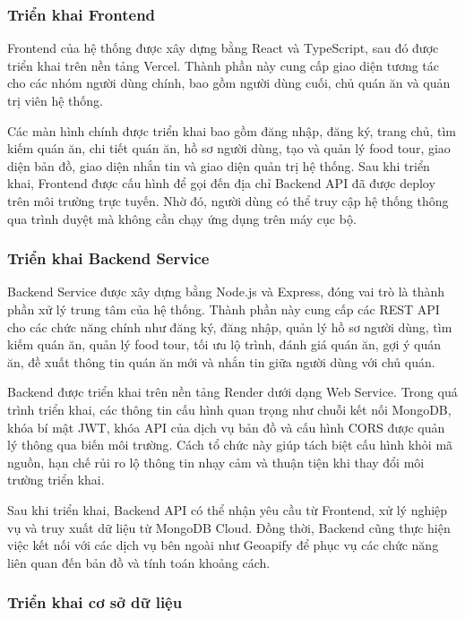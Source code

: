 \subsubsection{Triển khai Frontend}

Frontend của hệ thống được xây dựng bằng React và TypeScript, sau đó được triển khai
trên nền tảng Vercel. Thành phần này cung cấp giao diện tương tác cho các nhóm người
dùng chính, bao gồm người dùng cuối, chủ quán ăn và quản trị viên hệ thống.

Các màn hình chính được triển khai bao gồm đăng nhập, đăng ký, trang chủ, tìm kiếm
quán ăn, chi tiết quán ăn, hồ sơ người dùng, tạo và quản lý food tour, giao diện bản đồ,
giao diện nhắn tin và giao diện quản trị hệ thống. Sau khi triển khai, Frontend được cấu
hình để gọi đến địa chỉ Backend API đã được deploy trên môi trường trực tuyến. Nhờ đó,
người dùng có thể truy cập hệ thống thông qua trình duyệt mà không cần chạy ứng dụng
trên máy cục bộ.

\subsubsection{Triển khai Backend Service}

Backend Service được xây dựng bằng Node.js và Express, đóng vai trò là thành phần xử
lý trung tâm của hệ thống. Thành phần này cung cấp các REST API cho các chức năng
chính như đăng ký, đăng nhập, quản lý hồ sơ người dùng, tìm kiếm quán ăn, quản lý food
tour, tối ưu lộ trình, đánh giá quán ăn, gợi ý quán ăn, đề xuất thông tin quán ăn mới và
nhắn tin giữa người dùng với chủ quán.

Backend được triển khai trên nền tảng Render dưới dạng Web Service. Trong quá trình
triển khai, các thông tin cấu hình quan trọng như chuỗi kết nối MongoDB, khóa bí mật
JWT, khóa API của dịch vụ bản đồ và cấu hình CORS được quản lý thông qua biến môi
trường. Cách tổ chức này giúp tách biệt cấu hình khỏi mã nguồn, hạn chế rủi ro lộ thông
tin nhạy cảm và thuận tiện khi thay đổi môi trường triển khai.

Sau khi triển khai, Backend API có thể nhận yêu cầu từ Frontend, xử lý nghiệp vụ và truy
xuất dữ liệu từ MongoDB Cloud. Đồng thời, Backend cũng thực hiện việc kết nối với các
dịch vụ bên ngoài như Geoapify để phục vụ các chức năng liên quan đến bản đồ và tính
toán khoảng cách.

\subsubsection{Triển khai cơ sở dữ liệu}


